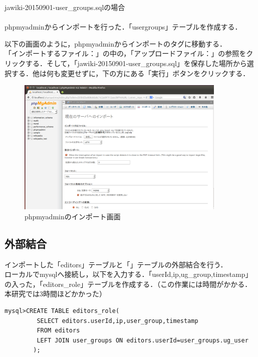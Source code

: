jawiki-20150901-user\_groups.sqlの場合\\
\\
phpmyadminからインポートを行った．「usergroups」テーブルを作成する．

以下の画面のように，phpmyadminからインポートのタグに移動する． \\
「インポートするファイル：」の中の，「アップロードファイル：」の参照をクリックする．そして，「jawiki-20150901-user\_groups.sql」を保存した場所から選択する．他は何も変更せずに，下の方にある「実行」ボタンをクリックする．

\begin{figure}[H]
\centering
\includegraphics[width=10cm]{inport.png}
\caption{phpmyadminのインポート画面}\label{サンプル図}
\end{figure}




\subsection{外部結合}

インポートした「editors」テーブルと「」テーブルの外部結合を行う．\\
ローカルでmysqlへ接続し，以下を入力する．「userId,ip,ug\_group,timestamp」の入った，「editors\_role」テーブルを作成する．（この作業には時間がかかる．本研究では3時間ほどかかった）


{\small
\begin{verbatim}
mysql>CREATE TABLE editors_role(
         SELECT editors.userId,ip,user_group,timestamp
         FROM editors
         LEFT JOIN user_groups ON editors.userId=user_groups.ug_user
        );
\end{verbatim}}

